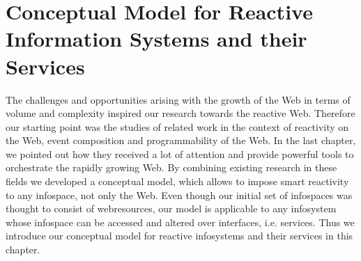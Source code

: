 

\chapter{Conceptual Model for Reactive Information Systems and their Services}
The challenges and opportunities arising with the growth of the Web in terms of volume and complexity inspired our research towards the reactive Web.
Therefore our starting point was the studies of related work in the context of reactivity on the Web, event composition and programmability of the Web.
In the last chapter, we pointed out how they received a lot of attention and provide powerful tools to orchestrate the rapidly growing Web.
By combining existing research in these fields we developed a conceptual model, which allows to impose smart reactivity to any \textrm{\gls{infospace}}, not only the Web.
Even though our initial set of \textrm{\glspl{infospace}} was thought to consist of \textrm{\glspl{webresource}}, our model is applicable to any \textrm{\gls{infosystem}} whose \textrm{\gls{infospace}} can be accessed and altered over interfaces, i.e. services.
Thus we introduce our conceptual model for reactive \textrm{\glspl{infosystem}} and their services in this chapter.

